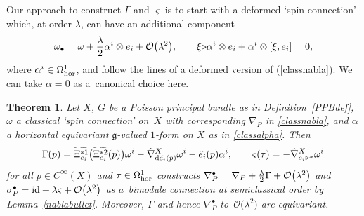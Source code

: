\documentclass[10pt,a4paper]{amsart}
\numberwithin{equation}{section}
\newtheorem{Theorem}{Theorem}[section]
\newcommand{\<}{{\langle}}
\renewcommand{\>}{{\rangle}}
\newcommand{\tens}{\otimes}
\newcommand{\id}{{\rm id}}
\newcommand{\extd}{{\rm d}}
\newcommand{\la}{{\triangleright}}
\newcommand{\cg}{{\mathfrak{g}}}
\begin{document}
Our approach to construct $\Gamma$ and $\varsigma$ is to start with a deformed `spin connection' which, at order $\lambda$, can have an additional component
 \begin{equation}\label{classalpha} \omega_\bullet=\omega+ {\lambda\over 2}\alpha^i\tens e_i+ \mathcal{O}\big(\lambda^2\big),\qquad \xi\la\alpha^i\tens e_i+ \alpha^i\tens [\xi,e_i]=0,\end{equation}
where $\alpha^i\in \Omega^1_{\rm hor}$, and follow the lines of a deformed version of (\ref{classnabla}). We can take $\alpha=0$ as a~canonical choice here.


\begin{Theorem}\label{semiclassbundleconn} Let $X$, $G$ be a Poisson principal bundle as in Definition~{\rm \ref{PPBdef}}, $\omega$ a classical `spin connection' on~$X$ with corresponding $\nabla_P$ in \eqref{classnabla}, and $\alpha$ a horizontal equivariant $\cg$-valued $1$-form on $X$ as in \eqref{classalpha}. Then
\begin{equation}\label{Gammaomega}\Gamma(p)=\widetilde{\Xi_{e_i}^{*1}}\big(\widetilde{\Xi_{e_i}^{*2}}(p)\big)\omega^i- \hat\nabla^X_{\extd \tilde{e_i}(p)}\omega^i-\tilde{e_i}(p)\alpha^i,\qquad \varsigma(\tau)=- \hat\nabla^X_{e_i\la\tau}\omega^i\end{equation}
for all $p\in C^\infty(X)$ and $\tau\in \Omega^1_{\rm hor}$ constructs $\nabla^\bullet_{P} =\nabla_P +{\lambda\over 2}\Gamma+ \mathcal{O}\big(\lambda^2\big)$ and $\sigma^\bullet_P=\id+\lambda\varsigma+\mathcal{O}\big(\lambda^2\big)$ as a~bimodule connection at semiclassical order by Lemma~{\rm \ref{nablabullet}}. Moreover, $\Gamma$ and hence $\nabla^\bullet_P$ to~$\mathcal{O}\big(\lambda^2\big)$ are equivariant.
\end{Theorem}
\end{document}
